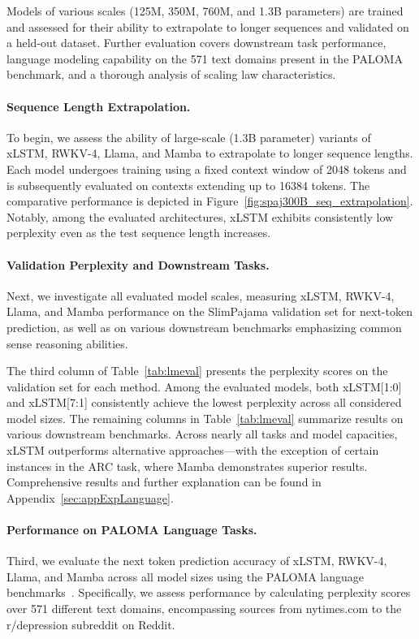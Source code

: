 Models of various scales (125M, 350M, 760M, and 1.3B parameters) are trained and assessed for their ability to extrapolate to longer sequences and validated on a held-out dataset. Further evaluation covers downstream task performance, language modeling capability on the 571 text domains present in the PALOMA benchmark, and a thorough analysis of scaling law characteristics.

\paragraph{Sequence Length Extrapolation.}
\label{sec:spaj300B_ctx_extrapolation}
To begin, we assess the ability of large-scale (1.3B parameter) variants of xLSTM, RWKV-4, Llama, and Mamba to extrapolate to longer sequence lengths. Each model undergoes training using a fixed context window of 2048 tokens and is subsequently evaluated on contexts extending up to 16384 tokens. The comparative performance is depicted in Figure~\ref{fig:spaj300B_seq_extrapolation}. Notably, among the evaluated architectures, xLSTM exhibits consistently low perplexity even as the test sequence length increases.

\paragraph{Validation Perplexity and Downstream Tasks.}
\label{sec:spaj_downstream_eval}
Next, we investigate all evaluated model scales, measuring xLSTM, RWKV-4, Llama, and Mamba performance on the SlimPajama validation set for next-token prediction, as well as on various downstream benchmarks emphasizing common sense reasoning abilities.

The third column of Table~\ref{tab:lmeval} presents the perplexity scores on the validation set for each method. Among the evaluated models, both xLSTM[1:0] and xLSTM[7:1] consistently achieve the lowest perplexity across all considered model sizes. The remaining columns in Table~\ref{tab:lmeval} summarize results on various downstream benchmarks. Across nearly all tasks and model capacities, xLSTM outperforms alternative approaches—with the exception of certain instances in the ARC task, where Mamba demonstrates superior results. Comprehensive results and further explanation can be found in Appendix~\ref{sec:appExpLanguage}.

\paragraph{Performance on PALOMA Language Tasks.} Third, we evaluate the next token prediction accuracy of xLSTM, RWKV-4, Llama, and Mamba across all model sizes using the PALOMA language benchmarks~\citep{Magnusson:23arxivshort}. Specifically, we assess performance by calculating perplexity scores over 571 different text domains, encompassing sources from nytimes.com to the r/depression subreddit on Reddit. 

